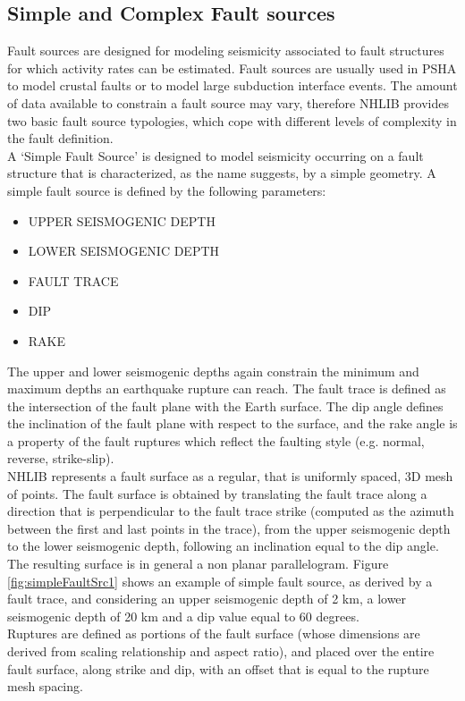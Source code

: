 \documentclass[11pt,a4paper,headings=small,dvips]{scrartcl}
\begin{document}
\subsection{Simple and Complex Fault sources}
\setcounter{figure}{0}
Fault sources are designed for modeling seismicity associated to fault structures for which activity rates can be estimated. Fault sources are usually used in PSHA to model crustal faults or to model large subduction interface events. The amount of data available to constrain a fault source may vary, therefore NHLIB provides two basic fault source typologies, which cope with different levels of complexity in the fault definition.\\
A `Simple Fault Source' is designed to model seismicity occurring on a fault structure that is characterized, as the name suggests, by a simple geometry. A simple fault source is defined by the following parameters:
\begin{itemize}
\item UPPER SEISMOGENIC DEPTH
\item LOWER SEISMOGENIC DEPTH
\item FAULT TRACE
\item DIP
\item RAKE
\end{itemize}
The upper and lower seismogenic depths again constrain the minimum and maximum depths an earthquake rupture can reach. The fault trace is defined as the intersection of the fault plane with the Earth surface. The dip angle defines the inclination of the fault plane with respect to the surface, and the rake angle is a property of the fault ruptures which reflect the faulting style (e.g. normal, reverse, strike-slip).\\
NHLIB represents a fault surface as a regular, that is uniformly spaced, 3D mesh of points. The fault surface is obtained by translating the fault trace along a direction that is perpendicular to the fault trace strike (computed as the azimuth between the first and last points in the trace), from the upper seismogenic depth to the lower seismogenic depth, following an inclination equal to the dip angle. The resulting surface is in general a non planar parallelogram. Figure \ref{fig:simpleFaultSrc1} shows an example of simple fault source, as derived by a fault trace, and considering an upper seismogenic depth of 2 km, a lower seismogenic depth of 20 km and a dip value equal to 60 degrees.\\
Ruptures are defined as portions of the fault surface (whose dimensions are derived from scaling relationship and aspect ratio), and placed over the entire fault surface, along strike and dip, with an offset that is equal to the rupture mesh spacing.\\
\end{document}
